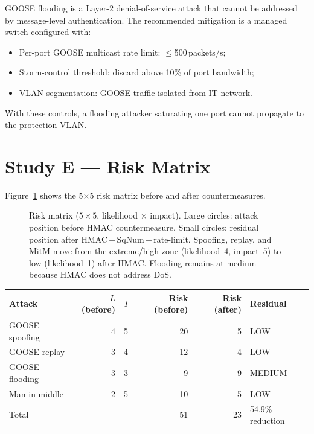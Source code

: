 \documentclass[11pt,a4paper]{article}
\begin{document}
GOOSE flooding is a Layer-2 denial-of-service attack that cannot be
addressed by message-level authentication.  The recommended mitigation
is a managed switch configured with:
\begin{itemize}
  \item Per-port GOOSE multicast rate limit: $\leq$500\,packets/s;
  \item Storm-control threshold: discard above 10\% of port bandwidth;
  \item VLAN segmentation: GOOSE traffic isolated from IT network.
\end{itemize}
With these controls, a flooding attacker saturating one port cannot
propagate to the protection VLAN.

\section{Study E --- Risk Matrix}
\label{sec:studyE}

Figure~\ref{fig:risk} shows the 5$\times$5 risk matrix before and after
countermeasures.

\begin{figure}[htbp]
  \centering
  \resizebox{0.72\textwidth}{!}{}
  \caption{Risk matrix ($5\times5$, likelihood $\times$ impact).  Large
           circles: attack position before HMAC countermeasure.  Small
           circles: residual position after HMAC\,+\,SqNum\,+\,rate-limit.
           Spoofing, replay, and MitM move from the extreme/high zone
           (likelihood~4, impact~5) to low (likelihood~1) after HMAC.
           Flooding remains at medium because HMAC does not address DoS.}
  \label{fig:risk}
\end{figure}

\begin{center}
\begin{tabular}{@{}lrrrrl@{}}
\toprule
Attack & $L$ (before) & $I$ & Risk (before) & Risk (after) & Residual \\
\midrule
GOOSE spoofing & 4 & 5 & 20 & 5 & LOW \\
GOOSE replay & 3 & 4 & 12 & 4 & LOW \\
GOOSE flooding & 3 & 3 & 9 & 9 & MEDIUM \\
Man-in-middle & 2 & 5 & 10 & 5 & LOW \\
\midrule
Total & & & 51 & 23 & 54.9\% reduction \\
\bottomrule
\end{tabular}
\end{center}
\end{document}
